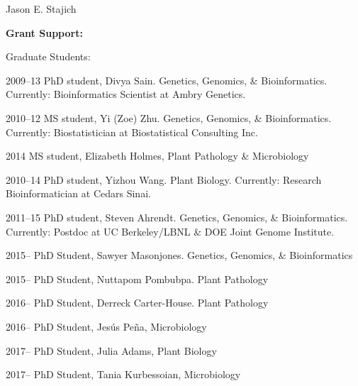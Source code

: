 \documentclass[10pt]{article}
\begin{document}
\begin{cv}{\centerline{Jason E. Stajich}}
\begin{cvlistcompact}{\bf Grant Support:}

\begin{cvlistcompact}{Graduate Students:}
\item [2009--13] PhD student, Divya Sain. Genetics, Genomics, \&
  Bioinformatics. Currently: Bioinformatics Scientist at Ambry Genetics.
\item [2010--12] MS student, Yi (Zoe) Zhu. Genetics, Genomics, \&
  Bioinformatics. Currently: Biostatistician at Biostatistical Consulting Inc.
\item [2014] MS student, Elizabeth Holmes, Plant Pathology \& Microbiology
\item [2010--14] PhD student, Yizhou Wang. Plant Biology. Currently:
  Research Bioinformatician at Cedars Sinai.
\item [2011--15] PhD student, Steven Ahrendt. Genetics, Genomics, \&
  Bioinformatics. Currently: Postdoc at UC Berkeley/LBNL \& DOE Joint
  Genome Institute.
\item [2015--] PhD Student, Sawyer Masonjones. Genetics, Genomics, \&
  Bioinformatics
\item [2015--] PhD Student, Nuttapom Pombubpa. Plant Pathology
\item [2016--] PhD Student, Derreck Carter-House. Plant Pathology
\item [2016--] PhD Student, Jes\'{u}s Pe\~{n}a, Microbiology
\item [2017--] PhD Student, Julia Adams, Plant Biology
\item [2017--] PhD Student, Tania Kurbessoian, Microbiology
\end{cvlistcompact}


\end{cvlistcompact}
\end{cv}
\end{document}
